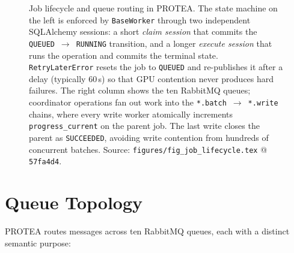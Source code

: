 \begin{figure}[htbp]
  \centering
  \resizebox{\textwidth}{!}{}
  \caption[Job lifecycle and queue routing in PROTEA]{%
    Job lifecycle and queue routing in PROTEA. The state machine on the left
    is enforced by \texttt{BaseWorker} through two independent SQLAlchemy
    sessions: a short \emph{claim session} that commits the
    \texttt{QUEUED}~$\to$~\texttt{RUNNING} transition, and a longer
    \emph{execute session} that runs the operation and commits the terminal
    state. \texttt{RetryLaterError} resets the job to \texttt{QUEUED} and
    re-publishes it after a delay (typically 60\,s) so that GPU contention
    never produces hard failures. The right column shows the ten RabbitMQ
    queues; coordinator operations fan out work into the
    \texttt{*.batch}~$\to$~\texttt{*.write} chains, where every write worker
    atomically increments \texttt{progress\_current} on the parent job. The
    last write closes the parent as \texttt{SUCCEEDED}, avoiding write
    contention from hundreds of concurrent batches.
    Source: \texttt{figures/fig\_job\_lifecycle.tex} @ \texttt{57fa4d4}.%
  }
  \label{fig:job-lifecycle}
\end{figure}

\section{Queue Topology}
\label{sec:queue-topology}

PROTEA routes messages across ten RabbitMQ queues, each with a distinct
semantic purpose:

